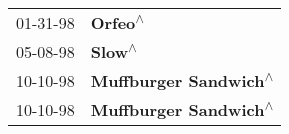 \begin{supertabular}{p{0.25\columnwidth}p{0.75\columnwidth}}
 01-31-98 &                \textbf{Orfeo\textsuperscript{$\wedge$}} \\
 05-08-98 &                 \textbf{Slow\textsuperscript{$\wedge$}} \\
 10-10-98 &  \textbf{Muffburger Sandwich\textsuperscript{$\wedge$}} \\
 10-10-98 &  \textbf{Muffburger Sandwich\textsuperscript{$\wedge$}} \\
\end{supertabular}
